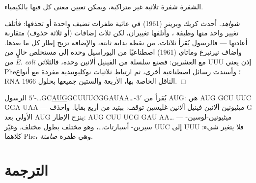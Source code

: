 \begin{proposition}\label{prop:b1:gene-expression:nirenberg}
الشفرة شفرة ثلاثية غير متراكبة، ويمكن تعيين معنى كل  فيها
بالكيمياء.
\end{proposition}
\begin{proof}[شواهد]
أحدث كريك وبرينر (1961) في  عاثية طفرات تضيف  واحدة أو
تحذفها: فأتلف تغيير واحد منها وظيفة ، وأتلفها تغييران، لكن
ثلاث إضافات (أو ثلاثة حذوف) متقاربة أعادتها --- فالرسول يُقرأ
ثلاثات، من نقطة بداية ثابتة، والإضافة تزيح إطار كل ما بعدها. وأضاف
نيرنبرغ وماتاي (1961)  اصطناعيًا من اليوراسيل وحده إلى مستخلص
خالٍ من  من \emph{E. coli} مع  العشرين: فصنع
سلسلة من الفينيل ألانين وحده، فالثلاثي UUU إذن يعني Phe؛ وأسندت رسائل
اصطناعية أخرى، ثم ارتباط ثلاثيات نوكليوتيدية مفردة  مع
أنواع RNA الناقل الخاصة بها،  الأربعة والستين جميعها بحلول
1966.
\end{proof}

\begin{example}\label{ex:b1:gene-expression:reading}
الرسول $5'$-\ldots{}GC\underline{AUG}GCUUUCGGAUAA\ldots{}-$3'$
يُقرأ من AUG: هي AUG GCU UUC GGA UAA --- ميثيونين-ألانين-فينيل
ألانين-غليسين-توقف: ببتيد من أربع بقايا. واحذف G الأولى بعد AUG
ينزح الإطار: AUG CUU UCG GAU AA\ldots{} --- ميثيونين-لوسين-سيرين-
أسبارتات\ldots، وهو  مختلف بطول مختلف. وغيّر UUC إلى UUU فلا
يتغير شيء: كلاهما Phe، وهي طفرة \emph{صامتة}.
\end{example}

\section{الترجمة}

